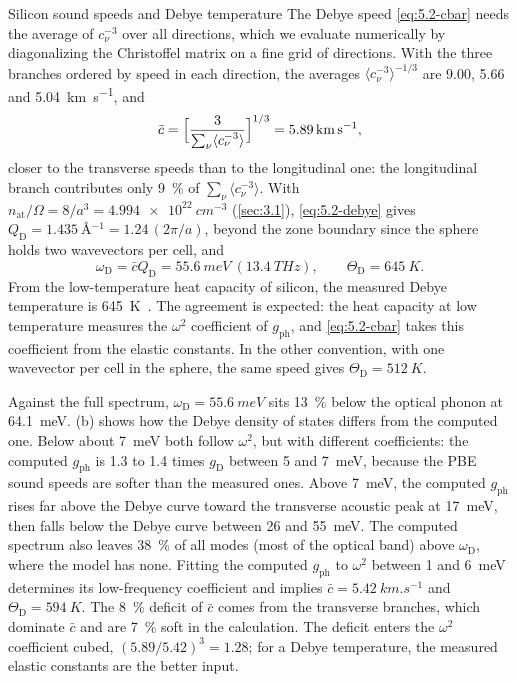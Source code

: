 \begin{workedexample}{Silicon sound speeds and Debye temperature}
The Debye speed \cref{eq:5.2-cbar} needs the average of $c_\nu^{-3}$ over all directions, which we evaluate numerically by diagonalizing the Christoffel matrix on a fine grid of directions. With the three branches ordered by speed in each direction, the averages $\langle c_\nu^{-3}\rangle^{-1/3}$ are 9.00, 5.66 and \SI{5.04}{km.s^{-1}}, and
\begin{equation*}
  \bar c = \Bigl[\frac{3}{\sum_\nu\langle c_\nu^{-3}\rangle}\Bigr]^{1/3} = \SI{5.89}{km.s^{-1}} ,
\end{equation*}
closer to the transverse speeds than to the longitudinal one: the longitudinal branch contributes only \SI{9}{\percent} of $\sum_\nu\langle c_\nu^{-3}\rangle$. With $n_{\mathrm{at}}/\Omega = 8/a^3 = \SI{4.994e22}{cm^{-3}}$ (\cref{sec:3.1}), \cref{eq:5.2-debye} gives $Q_{\mathrm{D}} = \SI{1.435}{\angstrom^{-1}} = 1.24\,(2\pi/a)$, beyond the zone boundary since the sphere holds two wavevectors per cell, and
\begin{equation*}
  \omega_{\mathrm{D}} = \bar cQ_{\mathrm{D}} = \SI{55.6}{meV} \ (\SI{13.4}{THz}) , \qquad \Theta_{\mathrm{D}} = \SI{645}{K} .
\end{equation*}
From the low-temperature heat capacity of silicon, the measured Debye temperature is \SI{645}{K}~\cite[Chap.~5, Table~1]{kittel2005introduction}. The agreement is expected: the heat capacity at low temperature measures the $\omega^2$ coefficient of $g_{\mathrm{ph}}$, and \cref{eq:5.2-cbar} takes this coefficient from the elastic constants. In the other convention, with one wavevector per cell in the sphere, the same speed gives $\Theta_{\mathrm{D}} = \SI{512}{K}$.

Against the full spectrum, $\omega_{\mathrm{D}} = \SI{55.6}{meV}$ sits \SI{13}{\percent} below the optical phonon at \SI{64.1}{meV}. (b) shows how the Debye density of states differs from the computed one. Below about \SI{7}{meV} both follow $\omega^2$, but with different coefficients: the computed $g_{\mathrm{ph}}$ is 1.3 to 1.4 times $g_{\mathrm{D}}$ between 5 and \SI{7}{meV}, because the PBE sound speeds are softer than the measured ones. Above \SI{7}{meV}, the computed $g_{\mathrm{ph}}$ rises far above the Debye curve toward the transverse acoustic peak at \SI{17}{meV}, then falls below the Debye curve between 26 and \SI{55}{meV}. The computed spectrum also leaves \SI{38}{\percent} of all modes (most of the optical band) above $\omega_{\mathrm{D}}$, where the model has none. Fitting the computed $g_{\mathrm{ph}}$ to $\omega^2$ between 1 and \SI{6}{meV} determines its low-frequency coefficient and implies $\bar c = \SI{5.42}{km.s^{-1}}$ and $\Theta_{\mathrm{D}} = \SI{594}{K}$. The \SI{8}{\percent} deficit of $\bar c$ comes from the transverse branches, which dominate $\bar c$ and are \SI{7}{\percent} soft in the calculation. The deficit enters the $\omega^2$ coefficient cubed, $(5.89/5.42)^3 = 1.28$; for a Debye temperature, the measured elastic constants are the better input.
\end{workedexample}
